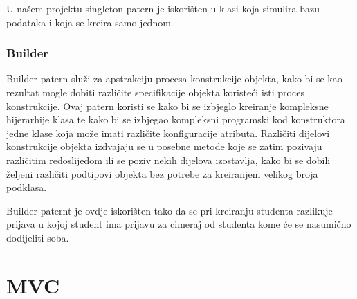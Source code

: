 \documentclass{article}
\begin{document}
U našem projektu singleton patern je iskorišten u klasi koja simulira bazu podataka i koja se kreira samo jednom.


\subsubsection*{Builder}

\hspace{\indent}Builder patern služi za apstrakciju procesa konstrukcije objekta, kako bi se kao rezultat
mogle dobiti različite specifikacije objekta koristeći isti proces konstrukcije. Ovaj patern koristi
se kako bi se izbjeglo kreiranje kompleksne hijerarhije klasa te kako bi se izbjegao kompleksni
programski kod konstruktora jedne klase koja može imati različite konfiguracije atributa.
Različiti dijelovi konstrukcije objekta izdvajaju se u posebne metode koje se zatim pozivaju
različitim redoslijedom ili se poziv nekih dijelova izostavlja, kako bi se dobili željeni različiti
podtipovi objekta bez potrebe za kreiranjem velikog broja podklasa.

Builder paternt je ovdje iskorišten tako da se pri kreiranju studenta razlikuje prijava u kojoj student ima prijavu za cimeraj od studenta kome će se nasumično dodijeliti soba.


\newpage

\section{MVC}
\end{document}
